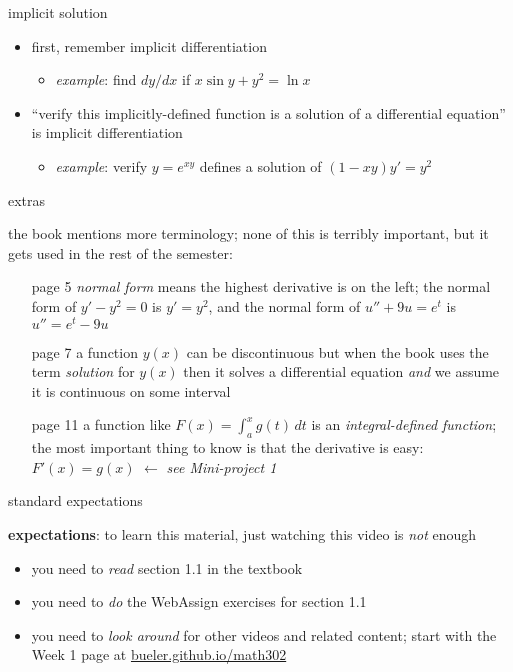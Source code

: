 \documentclass{beamer}
\begin{document}
\begin{frame}{implicit solution}

\begin{itemize}
\item first, remember implicit differentiation
    \begin{itemize}
    \item \emph{example}:  find $dy/dx$ if $x \sin y + y^2 = \ln x$
    \end{itemize}

\vspace{20mm}
\item ``verify this implicitly-defined function is a solution of a differential equation'' is implicit differentiation
    \begin{itemize}
    \item \emph{example}:  verify $y=e^{xy}$ defines a solution of $(1-xy)y'=y^2$
    \end{itemize}

\vspace{30mm}
\end{itemize}
\end{frame}


\begin{frame}{extras}

the book mentions more terminology; none of this is terribly important, but it gets used in the rest of the semester:
\begin{itemize}
\item[page 5] \emph{normal form} means the highest derivative is on the left; the normal form of $y' - y^2=0$ is $y'=y^2$, and the normal form of $u''+9u=e^t$ is $u'' = e^t - 9u$
\item[page 7] a function $y(x)$ can be discontinuous but when the book uses the term \emph{solution} for $y(x)$ then it solves a differential equation \emph{and} we assume it is continuous on some interval
\item[page 11] a function like $F(x) = \int_a^x g(t)\,dt$ is an \emph{integral-defined function}; the most important thing to know is that the derivative is easy: $F'(x)=g(x)$ \hfill $\longleftarrow$ \emph{see Mini-project 1}
\end{itemize}
\end{frame}

\begin{frame}{standard expectations}

\textbf{expectations}:  to learn this material, just watching this video is \emph{not} enough
\begin{itemize}
\item you need to \emph{read} section 1.1 in the textbook
\item you need to \emph{do} the WebAssign exercises for section 1.1
\item you need to \emph{look around} for other videos and related content; start with the Week 1 page at \href{https://bueler.github.io/math302/}{bueler.github.io/math302}
\end{itemize}
\end{frame}
\end{document}
